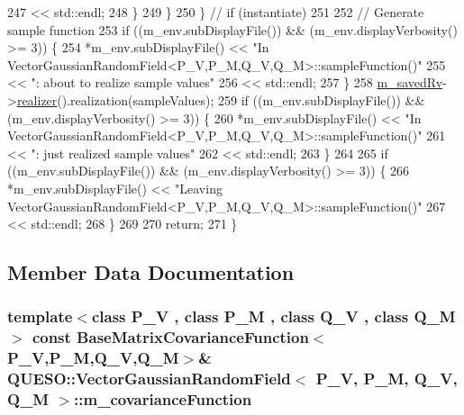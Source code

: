 \begin{DoxyCode}
247                                 << std::endl;
248       \}
249     \}
250   \} \textcolor{comment}{// if (instantiate)}
251 
252   \textcolor{comment}{// Generate sample function}
253   \textcolor{keywordflow}{if} ((m\_env.subDisplayFile()) && (m\_env.displayVerbosity() >= 3)) \{
254     *m\_env.subDisplayFile() << \textcolor{stringliteral}{"In VectorGaussianRandomField<P\_V,P\_M,Q\_V,Q\_M>::sampleFunction()"}
255                             << \textcolor{stringliteral}{": about to realize sample values"}
256                             << std::endl;
257   \}
258   \hyperlink{class_q_u_e_s_o_1_1_vector_gaussian_random_field_a7e2ed5d146f65c8c4ddbd1d4e496647d}{m\_savedRv}->\hyperlink{class_q_u_e_s_o_1_1_base_vector_r_v_aea4b01eef0baf36944d14459a7b9ccf4}{realizer}().realization(sampleValues);
259   \textcolor{keywordflow}{if} ((m\_env.subDisplayFile()) && (m\_env.displayVerbosity() >= 3)) \{
260     *m\_env.subDisplayFile() << \textcolor{stringliteral}{"In VectorGaussianRandomField<P\_V,P\_M,Q\_V,Q\_M>::sampleFunction()"}
261                             << \textcolor{stringliteral}{": just realized sample values"}
262                             << std::endl;
263   \}
264 
265   \textcolor{keywordflow}{if} ((m\_env.subDisplayFile()) && (m\_env.displayVerbosity() >= 3)) \{
266     *m\_env.subDisplayFile() << \textcolor{stringliteral}{"Leaving VectorGaussianRandomField<P\_V,P\_M,Q\_V,Q\_M>::sampleFunction()"}
267                             << std::endl;
268   \}
269 
270   \textcolor{keywordflow}{return};
271 \}
\end{DoxyCode}


\subsection{Member Data Documentation}
\hypertarget{class_q_u_e_s_o_1_1_vector_gaussian_random_field_a67b1325646a7076207d768cfd796eb95}{
\subsubsection[{m\-\_\-covariance\-Function}]{\setlength{\rightskip}{0pt plus 5cm}template$<$class P\-\_\-\-V , class P\-\_\-\-M , class Q\-\_\-\-V , class Q\-\_\-\-M $>$ const {\bf Base\-Matrix\-Covariance\-Function}$<$P\-\_\-\-V,P\-\_\-\-M,Q\-\_\-\-V,Q\-\_\-\-M$>$\& {\bf Q\-U\-E\-S\-O\-::\-Vector\-Gaussian\-Random\-Field}$<$ P\-\_\-\-V, P\-\_\-\-M, Q\-\_\-\-V, Q\-\_\-\-M $>$\-::m\-\_\-covariance\-Function\hspace{0.3cm}{\ttfamily [protected]}}}\label{class_q_u_e_s_o_1_1_vector_gaussian_random_field_a67b1325646a7076207d768cfd796eb95}


